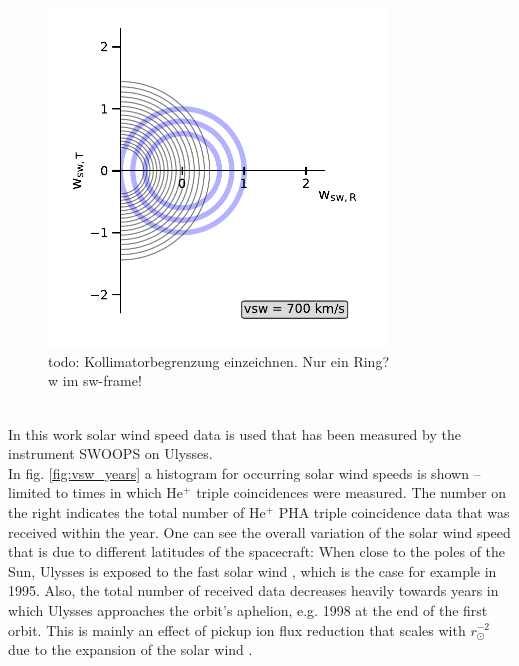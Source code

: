 \begin{figure}[h]
	\includegraphics[width=0.8\textwidth]{Figures/cov.pdf}
	\centering
	\caption{todo: Kollimatorbegrenzung einzeichnen. Nur ein Ring?\\
	w im sw-frame!}
	\label{fig:cov}
\end{figure}
\\
In this work solar wind speed data is used that has been measured by the instrument SWOOPS \citep[Solar Wind Observations Over the Poles of the Sun,][]{bame_swoops} on Ulysses. \\ 
In fig. \ref{fig:vsw_years} a histogram for occurring solar wind speeds is shown -- limited to times in which $\mathrm{He^{+}}$ triple coincidences were measured.  The number on the right indicates the total number of $\mathrm{He^{+}}$ PHA triple coincidence data that was received within the year. One can see the overall variation of the solar wind speed that is due to different latitudes of the spacecraft: When close to the poles of the Sun, Ulysses is exposed to the fast solar wind \citep{mccomas_2004}, which is the case for example in 1995. Also, the total number of received data decreases heavily towards years in which Ulysses approaches the orbit's aphelion, e.g. 1998 at the end of the first orbit. This is mainly an effect of pickup ion flux reduction that scales with $r_\odot^{-2}$ due to the expansion of the solar wind \citep[][,ch. 6.1]{prlss_2004}.
